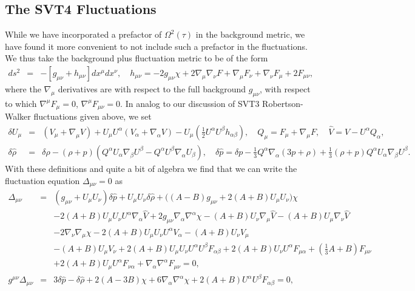 \documentclass[aps,onecolumn,10pt]{revtex4}
\numberwithin{equation}{section}
\numberwithin{equation}{section}
\begin{document}
\subsection{The SVT4 Fluctuations}

While we have incorporated a prefactor of $\Omega^2(\tau)$ in the background metric, we have found it more convenient to not include such a prefactor in the fluctuations. We thus take the background plus fluctuation metric to be of the form
%
\begin{eqnarray}
ds^2 &=&-[g_{\mu\nu}+h_{\mu\nu}]dx^{\mu}dx^{\nu},\quad h_{\mu\nu}= -2 g_{\mu\nu}\chi + 2\nabla_\mu \nabla_\nu F +\nabla_\mu F_\nu +\nabla_\nu F_\mu+ 2F_{\mu\nu},
\label{12.6}
\end{eqnarray}
%
where the $\nabla_{\mu}$ derivatives are with respect to the full background $g_{\mu\nu}$, with respect to which $\nabla^{\mu}F_{\mu}=0$, $\nabla^{\mu}F_{\mu\nu}=0$. In analog to our discussion of SVT3 Robertson-Walker fluctuations given above, we set
%
\begin{eqnarray}
\delta U_{\mu} &=& (V_\mu + \nabla_\mu V) + U_\mu U^\alpha(V_\alpha + \nabla_\alpha V)-U_\mu\left(\tfrac{1}{2} U^\alpha U^\beta h_{\alpha\beta}\right), \quad Q_\mu = F_\mu + \nabla_\mu F, \quad 
\hat{V}= V-U^\alpha Q_\alpha,
\nonumber\\
\delta \hat{\rho}{} &=& \delta \rho-(\rho+p)( Q^{\alpha } U_{\alpha } \nabla_{\beta }U^{\beta }-Q^{\alpha } U^{\beta } \nabla_{\alpha }U_{\beta }),\quad 
\delta \hat{p}{} = \delta p - \tfrac{1}{3} Q^{\alpha } \nabla_{\alpha }(3p+\rho) +  \tfrac{1}{3} (\rho+p) Q^{\alpha } U_{\alpha } \nabla_{\beta }U^{\beta }.
\label{12.7}
\end{eqnarray}
%
With these definitions and quite a bit of algebra we find that we can write the fluctuation equation $\Delta_{\mu\nu}=0$ as
%
\begin{eqnarray}
\Delta_{\mu\nu}&=& (g_{\mu \nu } + U_{\mu } U_{\nu }) \delta \hat{p}{} + U_{\mu } U_{\nu } \delta \hat{\rho}{} + \bigl((A -  B) g_{\mu \nu } + 2 (A + B) U_{\mu } U_{\nu }\bigr) \chi \nonumber \\ 
&& - 2 (A + B) U_{\mu } U_{\nu } U^{\alpha } \nabla_{\alpha }\hat{V}{} + 2 g_{\mu \nu } \nabla_{\alpha }\nabla^{\alpha }\chi -  (A + B) U_{\nu } \nabla_{\mu }\hat{V}{} -  (A + B) U_{\mu } \nabla_{\nu }\hat{V}{} \nonumber \\ 
&& - 2 \nabla_{\nu }\nabla_{\mu }\chi -2 (A + B) U_{\mu } U_{\nu } U^{\alpha } V_{\alpha } -  (A + B) U_{\nu } V_{\mu } \nonumber \\ 
&& -  (A + B) U_{\mu } V_{\nu }+2 (A + B) U_{\mu } U_{\nu } U^{\alpha } U^{\beta } F_{\alpha \beta } + 2 (A + B) U_{\nu } U^{\alpha } F_{\mu \alpha } + (\tfrac{1}{3} A + B) F_{\mu \nu } \nonumber \\ 
&& + 2 (A + B) U_{\mu } U^{\alpha } F_{\nu \alpha } + \nabla_{\alpha }\nabla^{\alpha }F_{\mu \nu }=0,
\nonumber\\ 
g^{\mu\nu}\Delta_{\mu\nu}&=& 3 \delta \hat{p}{} -  \delta \hat{\rho}{} + 2 (A - 3 B) \chi + 6 \nabla_{\alpha }\nabla^{\alpha }\chi +2 (A + B) U^{\alpha } U^{\beta } F_{\alpha \beta }=0,
\label{12.8}
\end{eqnarray}
\end{document}
